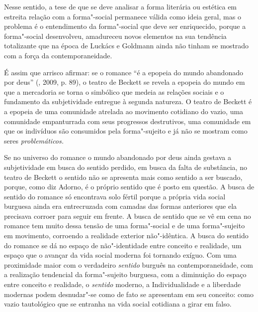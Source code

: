 Nesse sentido, a tese de que se deve analisar a forma literária ou
estética em estreita relação com a forma"-social permanece válida como
ideia geral, mas o problema é o entendimento da forma"-social que deve
ser enriquecido, porque a forma"-social desenvolveu, amadureceu novos
elementos na sua tendência totalizante que na época de Luckács e
Goldmann ainda não tinham se mostrado com a força da contemporaneidade.

É assim que arrisco afirmar: se o romance ``é a epopeia do mundo
abandonado por deus'' (, 2009, p. 89), o teatro de Beckett se
revela a epopeia do mundo em que a mercadoria se torna o simbólico que
medeia as relações sociais e o fundamento da subjetividade entregue à
segunda natureza. O teatro de Beckett é a epopeia de uma comunidade
atrelada ao movimento cotidiano do vazio, uma comunidade empanturrada
com seus progressos destrutivos, uma comunidade em que os indivíduos são
consumidos pela forma"-sujeito e já não se mostram como seres
\emph{problemáticos.}

Se no universo do romance o mundo abandonado por deus ainda gestava a
subjetividade em busca do sentido perdido, em busca da falta de
substância, no teatro de Beckett o sentido não se apresenta mais como
sentido a ser buscado, porque, como diz Adorno, é o próprio sentido que
é posto em questão. A busca de sentido do romance só encontrava solo
fértil porque a própria vida social burguesa ainda era entrecruzada com
camadas das formas anteriores que ela precisava corroer para seguir em
frente. A busca de sentido que se vê em cena no romance tem muito dessa
tensão de uma forma"-social e de uma forma"-sujeito em movimento,
corroendo a realidade exterior não"-idêntica. A busca do sentido do
romance se dá no espaço de não"-identidade entre conceito e realidade, um
espaço que o avançar da vida social moderna foi tornando exíguo. Com uma
proximidade maior com o verdadeiro \emph{sentido} burguês na
contemporaneidade, com a realização tendencial da forma"-sujeito
burguesa, com a diminuição do espaço entre conceito e realidade, o
\emph{sentido} moderno, a Individualidade e a liberdade modernas podem
desnudar"-se como de fato se apresentam em seu conceito: como vazio
tautológico que se entranha na vida social cotidiana a girar em falso.

